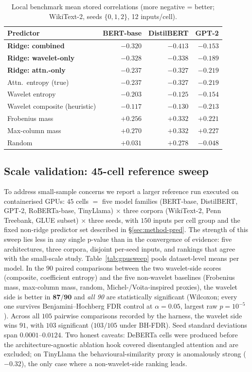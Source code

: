 \documentclass[conference]{IEEEtran}
\begin{document}
\begin{table}[t]
\centering
\caption{Local benchmark mean stored correlations (more negative =
better; WikiText-2, seeds $\{0,1,2\}$, 12 inputs/cell).}
\label{tab:bench}
\begin{tabular}{lrrr}
\toprule
Predictor & BERT-base & DistilBERT & GPT-2 \\
\midrule
\textbf{Ridge: combined}        & $-0.320$ & $\mathbf{-0.413}$ & $-0.153$ \\
\textbf{Ridge: wavelet-only}    & $\mathbf{-0.328}$ & $-0.338$ & $-0.189$ \\
\textbf{Ridge: attn.-only}      & $-0.237$ & $-0.327$ & $-0.219$ \\
Attn.\ entropy (true)           & $-0.237$ & $-0.327$ & $\mathbf{-0.219}$ \\
Wavelet entropy                 & $-0.203$ & $-0.125$ & $-0.154$ \\
Wavelet composite (heuristic)   & $-0.117$ & $-0.130$ & $-0.213$ \\
Frobenius mass                  & $+0.256$ & $+0.332$ & $+0.221$ \\
Max-column mass                 & $+0.270$ & $+0.332$ & $+0.227$ \\
Random                          & $+0.031$ & $+0.278$ & $-0.048$ \\
\bottomrule
\end{tabular}
\end{table}

\subsection{Scale validation: 45-cell reference sweep}
\label{sec:scale}
To address small-sample concerns we report a larger reference run
executed on containerised GPUs: $45$ cells $=$ five model families
(BERT-base, DistilBERT, GPT-2, RoBERTa-base, TinyLlama) $\times$ three
corpora (WikiText-2, Penn Treebank, GLUE subset) $\times$ three seeds,
with $150$ inputs per cell group and the fixed non-ridge predictor set
described in \S\ref{sec:method-pred}.
The strength of this sweep lies less in any single p-value than in the
convergence of evidence: five architectures, three corpora, disjoint
per-seed inputs, and rankings that agree with the small-scale study.
Table~\ref{tab:gpusweep} pools dataset-level means per model. In the
$90$ paired comparisons between the two wavelet-side scores
(composite, coefficient entropy) and the five non-wavelet baselines
(Frobenius mass, max-column mass, random, Michel-/Voita-inspired
proxies),
the wavelet side is better in $\mathbf{87/90}$ and \emph{all 90} are
statistically significant (Wilcoxon; every one survives
Benjamini--Hochberg FDR control at $\alpha{=}0.05$, largest raw
$p=10^{-5}$). Across all $105$ pairwise comparisons recorded by the
harness, the wavelet side wins $91$, with $103$ significant
($103/105$ under BH-FDR). Seed standard deviations span
$0.0001$--$0.0124$. Two honest caveats: DeBERTa cells were produced
before the architecture-agnostic ablation hook covered disentangled
attention and are excluded; on TinyLlama the behavioural-similarity
proxy is anomalously strong ($-0.32$), the only case where a
non-wavelet-side ranking leads.
\end{document}
